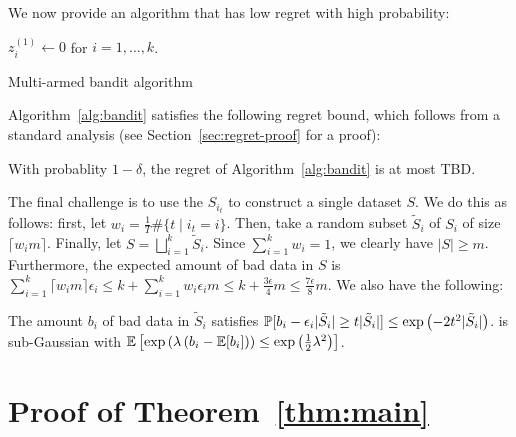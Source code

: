 \documentclass[anon,12pt]{colt2016} %
\newcommand{\failprob}{\delta}
\begin{document}
We now provide an algorithm that has low regret with high probability:

\begin{algorithm}
\SetAlgoLined
$z_i^{(1)} \gets 0$ for $i = 1, \ldots, k$.

\caption{Multi-armed bandit algorithm}
\label{alg:bandit}
\end{algorithm}

Algorithm~\ref{alg:bandit} satisfies the following regret bound, 
which follows from a standard analysis (see Section~\ref{sec:regret-proof} 
for a proof):
\begin{lemma}
\label{lem:regret}
With probablity $1-\failprob$, the regret of 
Algorithm~\ref{alg:bandit} is at most TBD.
\end{lemma}

The final challenge is to use the $S_{i_t}$ to construct a single dataset $S$. 
We do this as follows: first, let $w_i = \frac{1}{T}\#\{t \mid i_t = i\}$. Then, 
take a random subset $\tilde{S}_i$ of $S_i$ of size $\lceil w_im\rceil$. Finally, let 
$S = \bigsqcup_{i=1}^k \tilde{S}_i$. Since $\sum_{i=1}^k w_i = 1$, we clearly have $|S| \geq m$. 
Furthermore, the expected amount of bad data in $S$ is 
$\sum_{i=1}^k \lceil w_im\rceil \epsilon_i \leq k + \sum_{i=1}^k w_i\epsilon_i m 
\leq k + \frac{3\epsilon}{4} m \leq \frac{7\epsilon}{8} m$. We also have the following:
\begin{lemma}
The amount $b_i$ of bad data in $\tilde{S}_i$ satisfies 
$\mathbb{P}[b_i - \epsilon_i|\tilde{S}_i| \geq t|\tilde{S}_i|] \leq \exp\left(-2t^2|\tilde{S}_i|\right)$.
is sub-Gaussian with 
$\mathbb{E}\left[\exp\left(\lambda\left(b_i - \mathbb{E}[b_i]\right)\right) \leq \exp\left(\frac{1}{2}\lambda^2\right)\right]$.
\end{lemma}

\section{Proof of Theorem~\ref{thm:main}}
\label{sec:main-proof}
\end{document}
